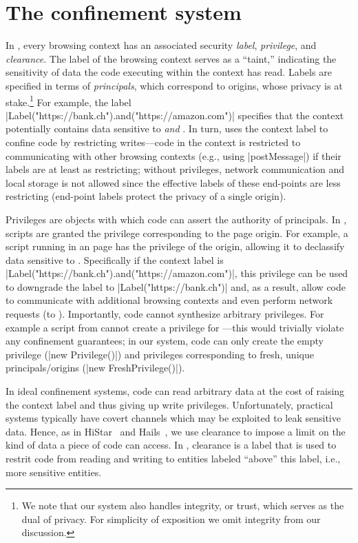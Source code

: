 \section{The \sys{} confinement system}
\label{sec:system}

In \sys, every browsing context has an associated security
\emph{label}, \emph{privilege}, and \emph{clearance}.
%
The label of the browsing context serves as a ``taint,'' indicating
the sensitivity of data the code executing within the context has
read.
%
Labels are specified in terms of \emph{principals}, which
correspond to origins, whose privacy is at stake.\footnote{
  We note that our system also handles integrity, or trust, which
  serves as the dual of privacy.
  For simplicity of exposition we omit integrity from our discussion.
}
%
For example, the label
\js|Label("https://bank.ch").and("https://amazon.com")| specifies that
the context potentially contains data sensitive to 
\emph{and} .
%
In turn, \sys{} uses the context label to confine code by restricting
writes---code in the context is restricted to communicating with other
browsing contexts (e.g., using \js|postMessage|) if their labels are at
least as restricting; without privileges, network communication and
local storage is not allowed since the effective labels of these
end-points are less restricting (end-point labels protect the privacy
of a single origin).

Privileges are objects with which code can assert the authority of
principals. 
%
In \sys, scripts are granted the privilege corresponding to the
page origin.
%
For example, a script running in an  page has the
privilege of the origin, allowing it to declassify data sensitive to
.
%
Specifically if the context label is
\js|Label("https://bank.ch").and("https://amazon.com")|, this privilege
can be used to downgrade the label to \js|Label("https://bank.ch")|
and, as a result, allow code to communicate with additional browsing
contexts and even perform network requests (to ).
%
Importantly, code cannot synthesize arbitrary privileges.
%
For example a  script from  cannot create a
privilege for ---this would trivially violate any
confinement guarantees;
%
in our system, code can only create the empty privilege
(\js|new Privilege()|) 
and privileges corresponding to fresh, unique principals/origins
(\js|new FreshPrivilege()|).

In ideal confinement systems, code can read arbitrary data at the cost
of raising the context label and thus giving up write privileges.
%
Unfortunately, practical systems typically have covert channels which
may be exploited to leak sensitive data.
%
Hence, as in HiStar~ and Hails~, we use
clearance to impose a limit on the kind of data a piece of code can
access.
%
In \sys, clearance is a label that is used to restrit code from
reading and writing to entities labeled ``above'' this label, i.e.,
more sensitive entities.

